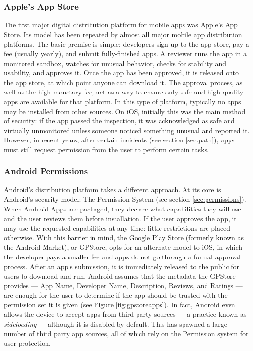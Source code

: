 \documentclass{acm_proc_article-sp}
\begin{document}
\subsubsection{Apple's App Store}
The first major digital distribution platform for mobile apps was Apple's App Store\citep{AppleAppStore}. Its model has been repeated by almost all major mobile app distribution platforms. The basic premise is simple: developers sign up to the app store, pay a fee (usually yearly), and submit fully-finished apps. A reviewer runs the app in a monitored sandbox, watches for unusual behavior, checks for stability and usability, and approves it. Once the app has been approved, it is released onto the app store, at which point anyone can download it. The approval process, as well as the high monetary fee, act as a way to ensure only safe and high-quality apps are available for that platform. In this type of platform, typically no apps may be installed from other sources. On iOS, initially this was the main method of security: if the app passed the inspection, it was acknowledged as safe and virtually unmonitored unless someone noticed something unusual and reported it. However, in recent years, after certain incidents (see section \ref{sec:path}), apps must still request permission from the user to perform certain tasks.

\subsubsection{Android Permissions}
Android's distribution platform takes a different approach. At its core is Android's security model: The Permission System (see section \ref{sec:permissions}). When Android Apps are packaged, they declare what capabilities they will use and the user reviews them before installation. If the user approves the app, it may use the requested capabilities at any time: little restrictions are placed otherwise. With this barrier in mind, the Google Play Store (formerly known as the Android Market), or GPStore, opts for an alternate model to iOS, in which the developer pays a smaller fee and apps do not go through a formal approval process. After an app's submission, it is immediately released to the public for users to download and run. Android assumes that the metadata the GPStore provides --- App Name, Developer Name, Description, Reviews, and Ratings --- are enough for the user to determine if the app should be trusted with the permission set it is given (see Figure \ref{fig:gpstoreapps}). In fact, Android even allows the device to accept apps from third party sources --- a practice known as \textit{sideloading} --- although it is disabled by default. This has spawned a large number of third party app sources, all of which rely on the Permission system for user protection.
\end{document}
